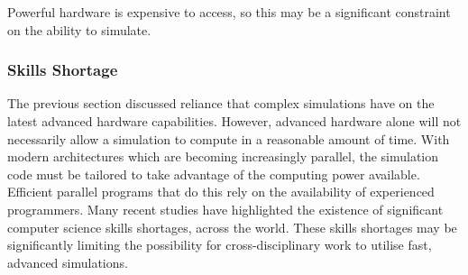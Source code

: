 \documentclass{UoYCSproject}
\begin{document}
Powerful hardware is expensive to access, so this may be a significant constraint on the ability to simulate.




\subsubsection{Skills Shortage}
\label{skills_shortage}
The previous section discussed reliance that complex simulations have on the latest advanced hardware capabilities.
However, advanced hardware alone will not necessarily allow a simulation to compute in a reasonable amount of time. 
With modern architectures which are becoming increasingly parallel, the simulation code must be tailored to take advantage of the computing power available.
Efficient parallel programs that do this rely on the availability of experienced programmers.
Many recent studies have highlighted the existence of significant computer science skills shortages, across the world\cite{digital_skills_uk, microsoft_blog}.
These skills shortages may be significantly limiting the possibility for cross-disciplinary work to utilise fast, advanced simulations.


\end{document}
